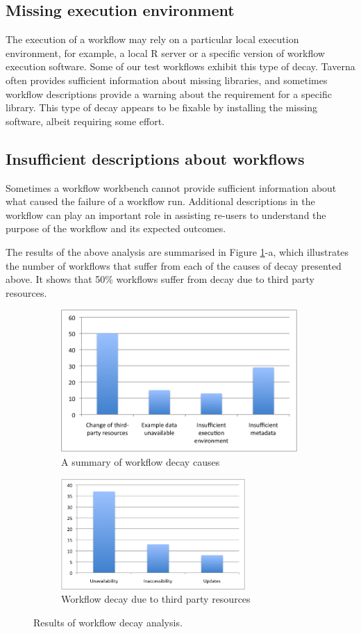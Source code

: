 \subsection{Missing execution environment}
The execution of a workflow may rely on a particular local execution environment, for example, a local R server or a specific version of workflow execution software. Some of our test workflows exhibit this type of decay. Taverna often provides sufficient information about missing libraries, and sometimes workflow descriptions provide a warning about the requirement for a specific library. This type of decay appears to be fixable by installing the missing software, albeit requiring some effort.

\subsection{Insufficient descriptions about workflows}
Sometimes a workflow workbench cannot provide sufficient information about what caused the failure of a workflow run. Additional descriptions in the workflow can play an important role in assisting re-users to understand the purpose of the workflow and its expected outcomes.



The results of the above analysis are summarised in Figure \ref{fig:decay-analysis}-a, which illustrates the number of workflows that suffer from each of the causes of decay presented above. It shows that {50\%} workflows suffer from decay due to third party resources. 

\begin{figure}[ht]
\centering
\begin{subfigure}[t]{10cm}
  \includegraphics[width=9cm]{./Figures/decay_analysis_chart1-v2.png}
  \caption{A summary of workflow decay causes}
\end{subfigure}
\begin{subfigure}[t]{8cm}
  \includegraphics[width=7cm]{./Figures/decay_analysis_chart2-v2.png}
  \caption{Workflow decay due to third party resources}
\end{subfigure}
\caption{Results of workflow decay analysis.}
\label{fig:decay-analysis}
\end{figure}


